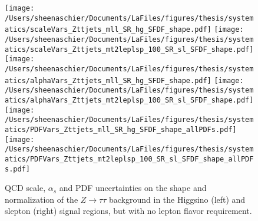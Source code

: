   \begin{figure}
  \centering
   \texttt{[image: /Users/sheenaschier/Documents/LaFiles/figures/thesis/systematics/scaleVars\_Zttjets\_mll\_SR\_hg\_SFDF\_shape.pdf]}
  \texttt{[image: /Users/sheenaschier/Documents/LaFiles/figures/thesis/systematics/scaleVars\_Zttjets\_mt2leplsp\_100\_SR\_sl\_SFDF\_shape.pdf]}
 \texttt{[image: /Users/sheenaschier/Documents/LaFiles/figures/thesis/systematics/alphaVars\_Zttjets\_mll\_SR\_hg\_SFDF\_shape.pdf]}
 \texttt{[image: /Users/sheenaschier/Documents/LaFiles/figures/thesis/systematics/alphaVars\_Zttjets\_mt2leplsp\_100\_SR\_sl\_SFDF\_shape.pdf]}
  \texttt{[image: /Users/sheenaschier/Documents/LaFiles/figures/thesis/systematics/PDFVars\_Zttjets\_mll\_SR\_hg\_SFDF\_shape\_allPDFs.pdf]}
  \texttt{[image: /Users/sheenaschier/Documents/LaFiles/figures/thesis/systematics/PDFVars\_Zttjets\_mt2leplsp\_100\_SR\_sl\_SFDF\_shape\_allPDFs.pdf]}
\caption{QCD scale, $\alpha_{s}$ and PDF uncertainties on the shape and normalization of the $Z\to\tau\tau$ background in the Higgsino (left) and slepton (right) signal regions, but with no lepton flavor requirement.}
\label{fig:theoryUncsZtt}
 \end{figure}
 
